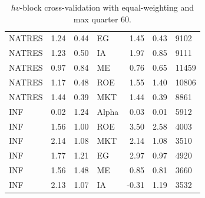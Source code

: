 \documentclass[12pt]{article}
\begin{document}
\begin{table}[ht]
\begin{tabular}{lrrlrrl}
		NATRES & 1.24 & 0.44 & EG & 1.45 & 0.43 & 9102 \\ 
		NATRES & 1.23 & 0.50 & IA & 1.97 & 0.85 & 9111 \\ 
		NATRES & 0.97 & 0.84 & ME & 0.76 & 0.65 & 11459 \\ 
		NATRES & 1.17 & 0.48 & ROE & 1.55 & 1.40 & 10806 \\ 
		NATRES & 1.44 & 0.39 & MKT & 1.44 & 0.39 & 8861 \\ 
		INF & 0.02 & 1.24 & Alpha & 0.03 & 0.01 & 5912 \\ 
		INF & 1.56 & 1.00 & ROE & 3.50 & 2.58 & 4003 \\ 
		INF & 2.14 & 1.08 & MKT & 2.14 & 1.08 & 3510 \\ 
		INF & 1.77 & 1.21 & EG & 2.97 & 0.97 & 4920 \\ 
		INF & 1.56 & 1.48 & ME & 0.85 & 0.81 & 3660 \\ 
		INF & 2.13 & 1.07 & IA & -0.31 & 1.19 & 3532 \\ 
		\hline
	\end{tabular}
	\caption{$hv$-block cross-validation with equal-weighting and max quarter 60.} 
	\label{tab:cv_60_ew}
\end{table}
\end{document}
